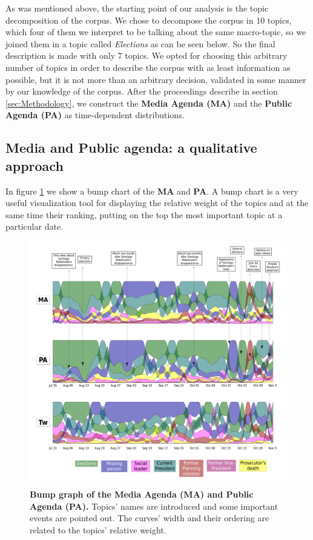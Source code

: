 
\par As was mentioned above, the starting point of our analysis is the topic decomposition of the corpus.
We chose to decompose the corpus in 10 topics, which four of them we interpret to be talking about the same macro-topic, so we joined them in a topic called \emph{Elections} as can be seen below. So the final description is made with only 7 topics.
We opted for choosing this arbitrary number of topics in order to describe the corpus with as least information as possible, but it is not more than an arbitrary decision, validated in some manner by our knowledge of the corpus.
After the proceedings describe in section \ref{sec:Methodology}, we construct the \textbf{Media Agenda (MA)} and the \textbf{Public Agenda (PA)} as time-dependent distributions. 

\subsection{Media and Public agenda: a qualitative approach}

\par In figure \ref{fig:all_agenda} we show a bump chart of the \textbf{MA} and \textbf{PA}. A bump chart is a very useful visualization tool for displaying the relative weight of the topics and at the same time their ranking, putting on the top the most important topic at a particular date.

\begin{figure}[h]
\includegraphics[width = \textwidth]{images/Fig1.pdf}
\caption{\textbf{Bump graph of the Media Agenda (MA) and Public Agenda (PA).} Topics’ names are introduced and some important events are pointed out. The curves’ width and their ordering are related to the topics’ relative weight.}
\label{fig:all_agenda}
\end{figure}
 
